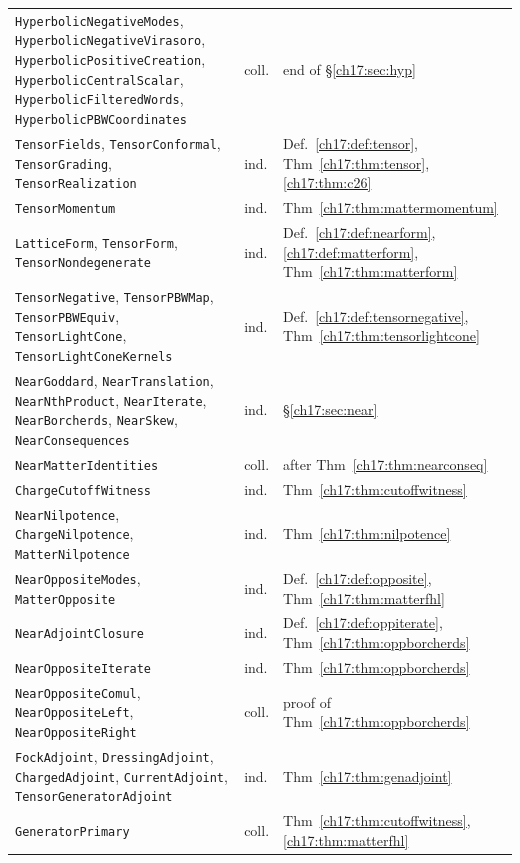 \begin{center}
\begin{longtable}{p{}p{}p{}}
\texttt{HyperbolicNegativeModes}, \texttt{HyperbolicNegativeVirasoro}, \texttt{HyperbolicPositiveCreation}, \texttt{HyperbolicCentralScalar}, \texttt{HyperbolicFilteredWords}, \texttt{HyperbolicPBWCoordinates} & coll. & end of \S\ref{ch17:sec:hyp} \\
\texttt{TensorFields}, \texttt{TensorConformal}, \texttt{TensorGrading}, \texttt{TensorRealization} & ind. & Def.~\ref{ch17:def:tensor}, Thm~\ref{ch17:thm:tensor}, \ref{ch17:thm:c26} \\
\texttt{TensorMomentum} & ind. & Thm~\ref{ch17:thm:mattermomentum} \\
\texttt{LatticeForm}, \texttt{TensorForm}, \texttt{TensorNondegenerate} & ind. & Def.~\ref{ch17:def:nearform}, \ref{ch17:def:matterform}, Thm~\ref{ch17:thm:matterform} \\
\texttt{TensorNegative}, \texttt{TensorPBWMap}, \texttt{TensorPBWEquiv}, \texttt{TensorLightCone}, \texttt{TensorLightConeKernels} & ind. & Def.~\ref{ch17:def:tensornegative}, Thm~\ref{ch17:thm:tensorlightcone} \\
\texttt{NearGoddard}, \texttt{NearTranslation}, \texttt{NearNthProduct}, \texttt{NearIterate}, \texttt{NearBorcherds}, \texttt{NearSkew}, \texttt{NearConsequences} & ind. & \S\ref{ch17:sec:near} \\
\texttt{NearMatterIdentities} & coll. & after Thm~\ref{ch17:thm:nearconseq} \\
\texttt{ChargeCutoffWitness} & ind. & Thm~\ref{ch17:thm:cutoffwitness} \\
\texttt{NearNilpotence}, \texttt{ChargeNilpotence}, \texttt{MatterNilpotence} & ind. & Thm~\ref{ch17:thm:nilpotence} \\
\texttt{NearOppositeModes}, \texttt{MatterOpposite} & ind. & Def.~\ref{ch17:def:opposite}, Thm~\ref{ch17:thm:matterfhl} \\
\texttt{NearAdjointClosure} & ind. & Def.~\ref{ch17:def:oppiterate}, Thm~\ref{ch17:thm:oppborcherds} \\
\texttt{NearOppositeIterate} & ind. & Thm~\ref{ch17:thm:oppborcherds} \\
\texttt{NearOppositeComul}, \texttt{NearOppositeLeft}, \texttt{NearOppositeRight} & coll. & proof of Thm~\ref{ch17:thm:oppborcherds} \\
\texttt{FockAdjoint}, \texttt{DressingAdjoint}, \texttt{ChargedAdjoint}, \texttt{CurrentAdjoint}, \texttt{TensorGeneratorAdjoint} & ind. & Thm~\ref{ch17:thm:genadjoint} \\
\texttt{GeneratorPrimary} & coll. & Thm~\ref{ch17:thm:cutoffwitness}, \ref{ch17:thm:matterfhl} \\

\end{longtable}
\end{center}
